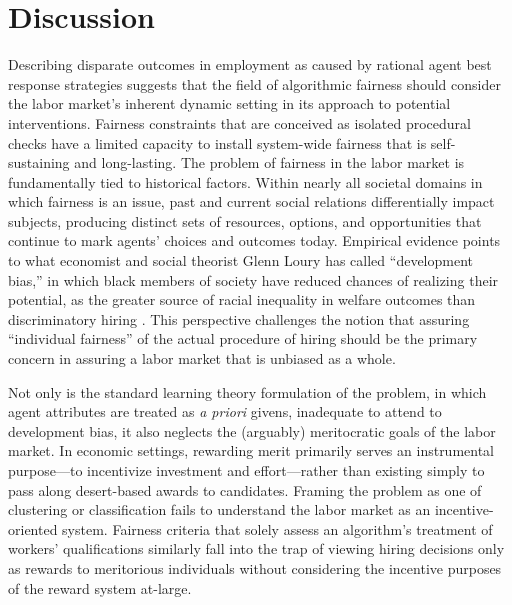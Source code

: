 \documentclass[sigconf]{acmart}
\theoremstyle{definition}
\begin{document}
\section{Discussion}
Describing disparate outcomes in employment as caused by rational agent best response strategies suggests that the field of algorithmic fairness should consider the labor market's inherent dynamic setting in its approach to potential interventions. Fairness constraints that are conceived as isolated procedural checks have a limited capacity to install system-wide fairness that is self-sustaining and long-lasting. The problem of fairness in the labor market is fundamentally tied to historical factors. Within nearly all societal domains in which fairness is an issue, past and current social relations differentially impact subjects, producing distinct sets of resources, options, and opportunities that continue to mark agents' choices and outcomes today. Empirical evidence points to what economist and social theorist Glenn Loury has called ``development bias,'' in which black members of society have reduced chances of realizing their potential, as the greater source of racial inequality in welfare outcomes than discriminatory hiring \cite{loury2009anatomy}. This perspective challenges the notion that assuring ``individual fairness'' of the actual procedure of hiring should be the primary concern in assuring a labor market that is unbiased as a whole. 

Not only is the standard learning theory formulation of the problem, in which agent attributes are treated as \textit{a priori} givens, inadequate to attend to development bias, it also neglects the (arguably) meritocratic goals of the labor market. In economic settings, rewarding merit primarily serves an instrumental purpose---to incentivize investment and effort---rather than existing simply to pass along desert-based awards to candidates. Framing the problem as one of clustering or classification fails to understand the labor market as an incentive-oriented system. Fairness criteria that solely assess an algorithm's treatment of workers' qualifications similarly fall into the trap of viewing hiring decisions only as rewards to meritorious individuals without considering the incentive purposes of the reward system at-large. 
\end{document}
